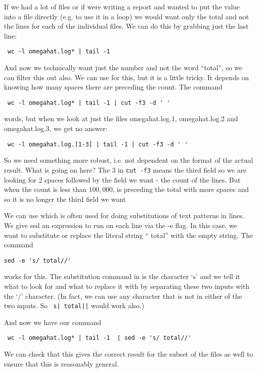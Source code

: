 \begin{enumerate}
If we had a lot of files or if were writing a report and wanted 
to put the value into a file directly (e.g. to use it in a loop)
we would want only the total and not the lines for each of the
individual  files.
We can do this by grabbing just the last line:
\begin{verbatim}
 wc -l omegahat.log* | tail -1
\end{verbatim}
And now we technically want just the number and not the word
``total'', so we can filter this out also.
We can use  for this, but it 
is a little tricky. It depends on knowing how many spaces
there are preceding the count.
The command
\begin{verbatim}
 wc -l omegahat.log* | tail -1 | cut -f3 -d ' '
\end{verbatim}
words, but  when we look at just the files
omegahat.log.1, omegahat.log.2 and omegahat.log.3,
we get no answer:
\begin{verbatim}
 wc -l omegahat.log.[1-3] | tail -1 | cut -f3 -d ' '
\end{verbatim}
So we need something more robust, i.e. not dependent
on the format of the actual result.
What is going on here?  The 3 in \verb+cut -f3+
means the third field so we are looking for 2 spaces
followed by the field we want - the count of the lines.
But when the count is less than $100,000$, 
 is preceding the total with more
spaces and so it is no longer the third field we want

We can use  which is often
used for doing substitutions of text patterns 
in lines.
We give sed an expression to run on each line
via the -e flag.
In this case, we want to substitute or replace the
literal string  `` total'' with the empty string.
The command
\begin{verbatim}
sed -e 's/ total//'
\end{verbatim}
works for this.  The substitution command in 
is the character `s' and we tell it what to look for and
what to replace it with by separating these two inputs
with the `/' character. (In fact, we can use any character
that is not in either of the two inputs.  So 
\verb+ s| total||+ would work also.)

And now we have our command
\begin{verbatim}
 wc -l omegahat.log* | tail -1  | sed -e 's/ total//'
\end{verbatim}
We can check that this gives the correct result for
the subset of the files as well to ensure that this
is reasonably general.


\end{enumerate}
